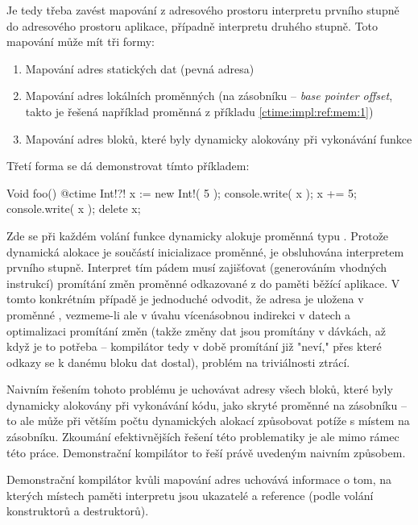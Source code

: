Je tedy třeba zavést mapování z adresového prostoru interpretu prvního stupně do adresového prostoru aplikace, případně interpretu druhého stupně. Toto mapování může mít tři formy:
\begin{enumerate}
	\item Mapování adres statických dat (pevná adresa)
	\item Mapování adres lokálních proměnných (na zásobníku -- \textit{base pointer offset}, takto je řešená například proměnná  z příkladu \ref{ctime:impl:ref:mem:1})
	\item Mapování adres \ctime bloků, které byly dynamicky alokovány při vykonávání \nonctime funkce
\end{enumerate}

Třetí forma se dá demonstrovat tímto příkladem:

\begin{code}
Void foo() {
	@ctime Int!?! x := new Int!( 5 );
	console.write( x );
	x += 5;
	console.write( x );
	delete x;
}
\end{code}

Zde se při každém volání funkce  dynamicky alokuje proměnná typu . Protože dynamická alokace je součástí inicializace \ctime proměnné, je obsluhována interpretem prvního stupně. Interpret tím pádem musí zajišťovat (generováním vhodných instrukcí) promítání změn proměnné odkazované z  do paměti běžící aplikace. V tomto konkrétním případě je jednoduché odvodit, že adresa je uložena v proměnné , vezmeme-li ale v úvahu vícenásobnou indirekci v \ctime datech a optimalizaci promítání změn (takže změny dat jsou promítány v dávkách, až když je to potřeba -- kompilátor tedy v době promítání již "neví," přes které odkazy se k danému bloku dat dostal), problém na triviálnosti ztrácí.

Naivním řešením tohoto problému je uchovávat adresy všech bloků, které byly dynamicky alokovány při vykonávání \ctime kódu, jako skryté proměnné na zásobníku -- to ale může při větším počtu dynamických alokací způsobovat potíže s místem na zásobníku. Zkoumání efektivnějších řešení této problematiky je ale mimo rámec této práce. Demonstrační kompilátor to řeší právě uvedeným naivním způsobem.

Demonstrační kompilátor kvůli mapování adres uchovává informace o tom, na kterých místech paměti interpretu jsou ukazatelé a reference (podle volání konstruktorů a destruktorů). 

